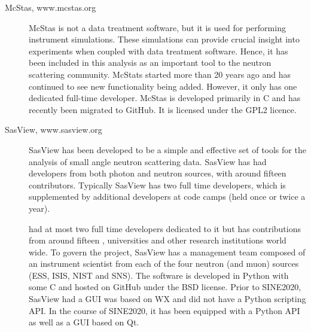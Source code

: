 \documentclass[jnr]{iosart2x}
\begin{document}
\begin{description}
\item[McStas, www.mcstas.org] McStas is not a data treatment software, but it is used for performing instrument simulations.
These simulations can provide crucial insight into experiments when coupled with data treatment software.
Hence, it has been included in this analysis as an important tool to the neutron scattering community.
McStats started more than 20 years ago and has continued to see new functionality being added.
However, it only has one dedicated full-time developer.
McStas is developed primarily in C and has recently been migrated to GitHub.
It is licensed under the GPL2 licence.

\item[SasView, www.sasview.org] SasView has been developed to be a simple and effective set of tools for the analysis of small angle neutron scattering data.
SasView has had developers from both photon and neutron sources, with around fifteen contributors.
Typically SasView has two full time developers, which is supplemented by additional developers at code camps (held once or twice a year).

had at most two full time developers dedicated to it but has contributions from around fifteen , universities and other research institutions world wide.
To govern the project, SasView has a management team composed of an instrument scientist from each of the four neutron (and muon) sources (ESS, ISIS, NIST and SNS).
The software is developed in Python with some C and hosted on GitHub under the BSD license.
Prior to SINE2020, SasView had a GUI was based on WX and did not have a Python scripting API.
In the course of SINE2020, it has been equipped with a Python API as well as a GUI based on Qt.

\end{description}
\end{document}
